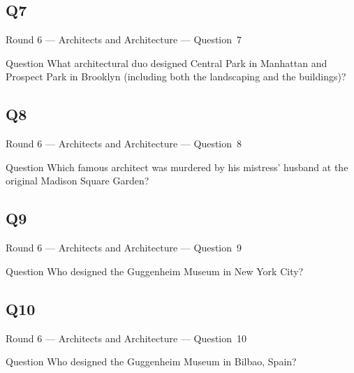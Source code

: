 \documentclass[11pt]{beamer}
\begin{document}
\subsection*{Q7}
\begin{frame}[t]{Round 6 --- Architects and Architecture --- \mbox{Question 7}}
\vspace{-0.5em}
\begin{block}{Question}
What architectural duo designed Central Park in Manhattan and Prospect Park in Brooklyn (including both the landscaping and the buildings)? 
\end{block}
\end{frame}
\subsection*{Q8}
\begin{frame}[t]{Round 6 --- Architects and Architecture --- \mbox{Question 8}}
\vspace{-0.5em}
\begin{block}{Question}
Which famous architect was murdered by his mistress' husband at the original Madison Square Garden?
\end{block}
\end{frame}
\subsection*{Q9}
\begin{frame}[t]{Round 6 --- Architects and Architecture --- \mbox{Question 9}}
\vspace{-0.5em}
\begin{block}{Question}
Who designed the Guggenheim Museum in New York City?
\end{block}
\end{frame}
\subsection*{Q10}
\begin{frame}[t]{Round 6 --- Architects and Architecture --- \mbox{Question 10}}
\vspace{-0.5em}
\begin{block}{Question}
Who designed the Guggenheim Museum in Bilbao, Spain? 
\end{block}
\end{frame}
\end{document}
